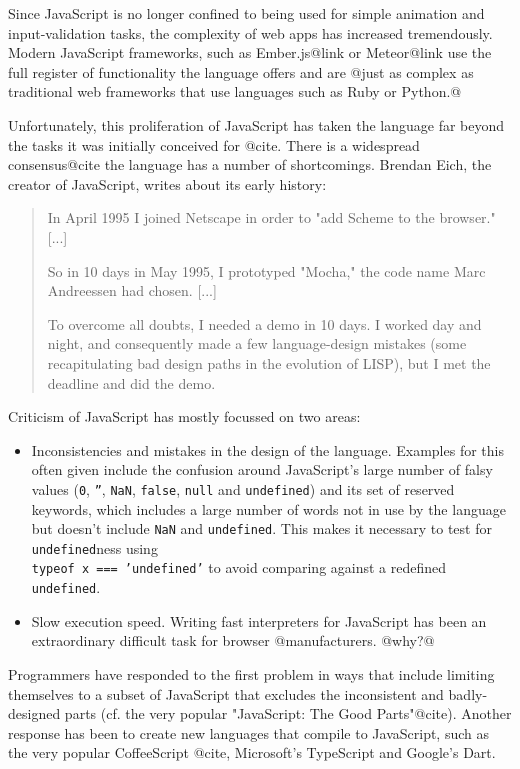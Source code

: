 \documentclass[11pt]{report}
\begin{document}
Since JavaScript is no longer confined to being used for simple animation and input-validation tasks, the complexity of web apps has increased tremendously. Modern JavaScript frameworks, such as Ember.js@link or Meteor@link use the full register of functionality the language offers and are @just as complex as traditional web frameworks that use languages such as Ruby or Python.@

Unfortunately, this proliferation of JavaScript has taken the language far beyond the tasks it was initially conceived for @cite. There is a widespread consensus@cite the language has a number of shortcomings. Brendan Eich, the creator of JavaScript, writes\cite{brendeich} about its early history:
\begin{quote}
In April 1995 I joined Netscape in order to "add Scheme to the browser." [...]

So in 10 days in May 1995, I prototyped "Mocha," the code name Marc Andreessen had chosen. [...]

To overcome all doubts, I needed a demo in 10 days. I worked day and night, and consequently made a few language-design mistakes (some recapitulating bad design paths in the evolution of LISP), but I met the deadline and did the demo.
\end{quote}

Criticism of JavaScript has mostly focussed on two areas:
\begin{itemize}
\item Inconsistencies and mistakes in the design of the language. Examples for this often given include the confusion around JavaScript's large number of falsy values (\texttt{0},  \texttt{''}, \texttt{NaN}, \texttt{false}, \texttt{null} and \texttt{undefined}) and its set of reserved keywords, which includes a large number of words not in use by the language but doesn't include \texttt{NaN} and \texttt{undefined}. This makes it necessary to test for \texttt{undefined}ness using \\
\mbox{\texttt{typeof x === 'undefined'}} to avoid comparing against a redefined \texttt{undefined}.
\item Slow execution speed. Writing fast interpreters for JavaScript has been an extraordinary difficult task for browser @manufacturers. @why?@
\end{itemize}

Programmers have responded to the first problem in ways that include limiting themselves to a subset of JavaScript that excludes the inconsistent and badly-designed parts (cf. the very popular "JavaScript: The Good Parts"@cite). Another response has been to create new languages that compile to JavaScript, such as the very popular CoffeeScript @cite, Microsoft's TypeScript and Google's Dart.
\end{document}
